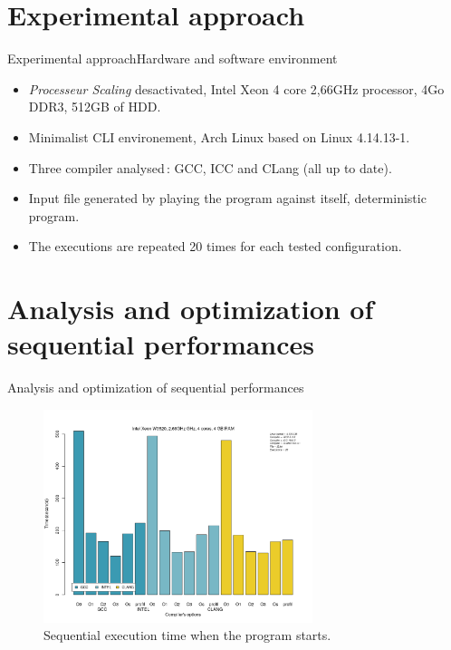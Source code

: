 \documentclass{beamer}
\begin{document}
\section{Experimental approach}
\begin{frame}{Experimental approach}{Hardware and software environment}
\begin{itemize}
  \item
  	\textit{Processeur Scaling} desactivated, Intel Xeon 4 core 2,66GHz processor, 4Go DDR3, 512GB of HDD.
  \item
    Minimalist CLI environement, Arch Linux based on Linux 4.14.13-1.
    \item
    Three compiler analysed\,: GCC, ICC and CLang (all up to date).
    \item
    Input file generated by playing the program against itself, deterministic program.
    \item
    The executions are repeated 20 times for each tested configuration.
\end{itemize}
\end{frame}

\section{Analysis and optimization of sequential performances}

\begin{frame}{Analysis and optimization of sequential performances}

\begin{figure}
      \includegraphics[width=0.7\textwidth]{GCCvsICCvsCLANG_j2.png}
      \caption{Sequential execution time when the program starts.}
\end{figure}
\end{frame}
\end{document}
